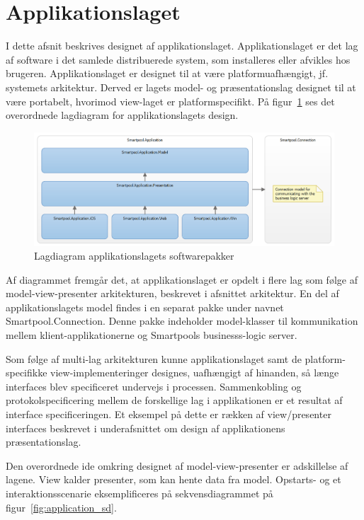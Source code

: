 \section{Applikationslaget}
I dette afsnit beskrives designet af applikationslaget. Applikationslaget er det lag af software i det samlede distribuerede system, som installeres eller afvikles hos brugeren. Applikationslaget er designet til at være platformuafhængigt, jf. systemets arkitektur. Derved er lagets model- og præsentationslag designet til at være portabelt, hvorimod view-laget er platformspecifikt. På figur~\ref{fig:application_layer} ses det overordnede lagdiagram for applikationslagets design.

\begin{figure}
	\centering
	\includegraphics[width=1.0\linewidth]{figs/design/application_layer}
	\caption{Lagdiagram applikationslagets softwarepakker}
	\label{fig:application_layer}
\end{figure}

Af diagrammet fremgår det, at applikationslaget er opdelt i flere lag som følge af model-view-presenter arkitekturen, beskrevet i afsnittet arkitektur. En del af applikationslagets model findes i en separat pakke under navnet Smartpool.Connection. Denne pakke indeholder model-klasser til kommunikation mellem klient-applikationerne og Smartpools businesss-logic server.

Som følge af multi-lag arkitekturen kunne applikationslaget samt de platform-specifikke view-implementeringer designes, uafhængigt af hinanden, så længe interfaces blev specificeret undervejs i processen. Sammenkobling og protokolspecificering mellem de forskellige lag i applikationen er et resultat af interface specificeringen. Et eksempel på dette er rækken af view/presenter interfaces beskrevet i underafsnittet om design af applikationens præsentationslag.

Den overordnede ide omkring designet af model-view-presenter er adskillelse af lagene. View kalder presenter, som kan hente data fra model. Opstarts- og et interaktionsscenarie eksemplificeres på sekvensdiagrammet på figur~\ref{fig:application_sd}.

